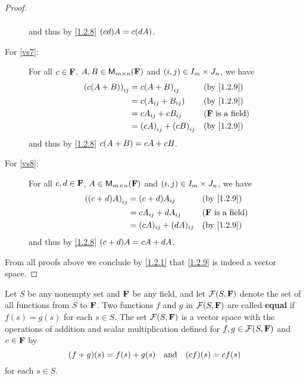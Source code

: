 \begin{proof}
\begin{description}
\begin{align*}
            \end{align*}
            and thus by \cref{1.2.8} \(\p{cd} A = c \p{dA}\).
        \item[For \ref{vs7}:]
            For all \(c \in \mathbf{F}\), \(A, B \in {\mathsf{M}_{{m} \times n}({\mathbf{F}})}\) and \(\left\lparen i, j\right\rparen \in I_{m} \times J_{n}\), we have
            \begin{align*}
                \p{c \p{A + B}}_{i j} & = c \p{A + B}_{i j}           &  & \text{(by \cref{1.2.9})}   \\
                                      & = c \p{A_{i j} + B_{i j}}     &  & \text{(by \cref{1.2.9})}   \\
                                      & = c A_{i j} + c B_{i j}       &  & \text{(\(\F\) is a field)} \\
                                      & = \p{cA}_{i j} + \p{cB}_{i j} &  & \text{(by \cref{1.2.9})}
            \end{align*}
            and thus by \cref{1.2.8} \(c \p{A + B} = cA + cB\).
        \item[For \ref{vs8}:]
            For all \(c, d \in \mathbf{F}\), \(A \in {\mathsf{M}_{{m} \times n}({\mathbf{F}})}\) and \(\left\lparen i, j\right\rparen \in I_{m} \times J_{n}\), we have
            \begin{align*}
                \p{\p{c + d} A}_{i j} & = \p{c + d} A_{i j}       &  & \text{(by \cref{1.2.9})}   \\
                                      & = c A_{i j} + d A_{i j}   &  & \text{(\(\F\) is a field)} \\
                                      & = (cA)_{i j} + (dA)_{i j} &  & \text{(by \cref{1.2.9})}
            \end{align*}
            and thus by \cref{1.2.8} \(\p{c + d} A = cA + dA\).
    \end{description}
    From all proofs above we conclude by \cref{1.2.1} that \cref{1.2.9} is indeed a vector space.
\end{proof}

\begin{eg}\label{1.2.10}
    Let \(S\) be any nonempty set and \(\mathbf{F}\) be any field, and let \(\mathcal{F}\p{S, \F}\) denote the set of all functions from \(S\) to \(\mathbf{F}\).
    Two functions \(f\) and \(g\) in \(\mathcal{F}\p{S, \F}\) are called \textbf{equal} if \(f(s) = g(s)\) for each \(s \in S\).
    The set \(\mathcal{F}\p{S, \F}\) is a vector space with the operations of addition and scalar multiplication defined for \(f, g \in \mathcal{F}\p{S, \F}\) and \(c \in \mathbf{F}\) by
    \[
        \p{f + g}\p{s} = f\p{s} + g\p{s} \quad \text{and} \quad \p{cf}\p{s} = cf\p{s}
    \]
    for each \(s \in S\).
\end{eg}

